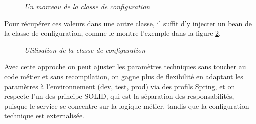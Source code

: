 \documentclass[12pt,a4paper]{report}
\begin{document}
	\begin{figure}[H]
		\centering
		\caption{\textit{Un morceau de la classe de configuration}}
		\label{fig:configuration-property-value}
	\end{figure}
	
	Pour récupérer ces valeurs dans une autre classe, il suffit d'y injecter un bean de la classe de configuration, comme le montre l'exemple dans la figure \ref{fig:using-configuration-property-value}.
	
	\begin{figure}[H]
		\centering
		\caption{\textit{Utilisation de la classe de configuration}}
		\label{fig:using-configuration-property-value}
	\end{figure}
	
	Avec cette approche on peut ajuster les paramètres techniques sans toucher au code métier et sans recompilation, on gagne plus de flexibilité en adaptant les paramètres à l'environnement (dev, test, prod) via des profils Spring, et on respecte l'un des principe SOLID, qui est la séparation des responsabilités, puisque le service se concentre sur la logique métier, tandis que la configuration technique est externalisée.
	
\end{document}
